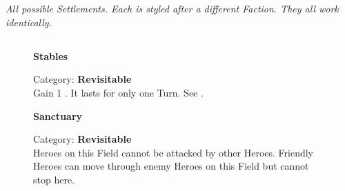 \begin{center}
  \\
  \\
  \textit{All possible Settlements.
  Each is styled after a different Faction.
  They all work identically.}
\end{center}
\pagebreak

\subsection*{}

\begin{figure}[H]
  \begin{minipage}[t]{0.47\textwidth}
    \vspace{0pt}
    \centering
    \phantom{j}\textbf{Stables}\phantom{j}\par
    \caption{\small Category: \textbf{Revisitable}\\
      Gain 1 .
      It lasts for only one Turn.
      See \protect{}.
    }
  \end{minipage}\hfill
  \begin{minipage}[t]{0.47\textwidth}
    \vspace{0pt}
    \centering
    \textbf{Sanctuary}\par
    \caption{\small Category: \textbf{Revisitable}\\
      Heroes on this Field cannot be attacked by other Heroes.
      Friendly Heroes can move through enemy Heroes on this Field but cannot stop here.}
  \end{minipage}
\end{figure}

